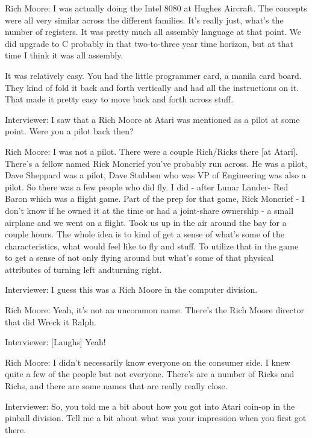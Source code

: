 \textcolor{interviewee}{Rich Moore:} I was actually doing the Intel 8080 at Hughes Aircraft. The concepts were all very similar across the different families. It’s really just, what's the number of registers. It was pretty much all assembly language at that point. We did upgrade to C probably in that two-to-three year time horizon, but at that time I think it was all assembly. 

It was relatively easy. You had the little programmer card, a manila card board. They kind of fold it back and forth vertically and had all the instructions on it. That made it pretty easy to move back and forth across stuff.

\textcolor{interviewer}{Interviewer:} I saw that a Rich Moore at Atari was mentioned as a pilot at some point. Were you a pilot back then?

\textcolor{interviewee}{Rich Moore:} I was not a pilot. There were a couple Rich/Ricks there [at Atari]. There’s a fellow named Rick Moncrief you’ve probably run across. He was a pilot, Dave Sheppard was a pilot, Dave Stubben who was VP of Engineering was also a pilot. So there was a few people who did fly. I did - after Lunar Lander- Red Baron which was a flight game. Part of the prep for that game, Rick Moncrief - I don’t know if he owned it at the time or had a joint-share ownership - a small airplane and we went on a flight. Took us up in the air around the bay for a couple hours. The whole idea is to kind of get a sense of what's some of the characteristics, what would feel like to fly and stuff. To utilize that in the game to get a sense of not only flying around but what's some of that physical attributes of turning left andturning right.

\textcolor{interviewer}{Interviewer:} I guess this was a Rich Moore in the computer division.

\textcolor{interviewee}{Rich Moore:} Yeah, it’s not an uncommon name. There’s the Rich Moore director that did Wreck it Ralph.

\textcolor{interviewer}{Interviewer:} [Laughs] Yeah!

\textcolor{interviewee}{Rich Moore:} I didn’t necessarily know everyone on the consumer side. I knew quite a few of the people but not everyone. There’s are a number of Ricks and Richs, and there are some names that are really really close.

\textcolor{interviewer}{Interviewer:} So, you told me a bit about how you got into Atari coin-op in the pinball division. Tell me a bit about what was your impression when you first got there.

